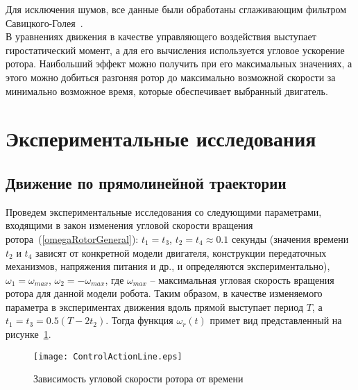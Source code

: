 Для исключения шумов, все данные были обработаны сглаживающим фильтром Савицкого-Голея~\cite{SGolay}.\\

В уравнениях движения в качестве управляющего воздействия выступает гиростатический момент, а для его вычисления используется угловое ускорение ротора. Наибольший эффект можно получить при его максимальных значениях, а этого можно добиться разгоняя ротор до максимально возможной скорости за минимально возможное время, которые обеспечивает выбранный двигатель.

\section{Экспериментальные исследования}

\subsection{Движение по прямолинейной траектории}

Проведем экспериментальные исследования со следующими параметрами, входящими в закон изменения угловой скорости вращения ротора~(\ref{omegaRotorGeneral}): $t_1=t_3$, $ t_2 = t_4 \approx 0.1 $ секунды (значения времени $ t_2$ и $ t_4 $ зависят от конкретной модели двигателя, конструкции передаточных механизмов, напряжения питания и др., и определяются экспериментально), $ \omega_1 = \omega_{max} $, $ \omega_2 = -\omega_{max} $, где $ \omega_{max} $ -- максимальная угловая скорость вращения ротора для данной модели робота. Таким образом, в качестве изменяемого параметра в экспериментах движения вдоль прямой выступает период $ T $, а $t_1=t_3 = 0.5(T - 2t_2)$. Тогда функция $ \omega_r(t) $ примет вид представленный на рисунке~\ref{ControlActionLine}.


\begin{figure}[!ht]
	\centering
	\texttt{[image: ControlActionLine.eps]}
	\caption{Зависимость угловой скорости ротора от времени}
	\label{ControlActionLine}
\end{figure}

%	
%	
%	
%	
%	

